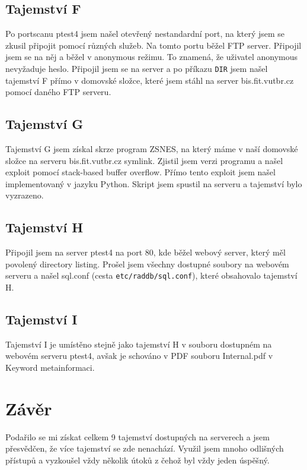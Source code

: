 \documentclass[11pt,a4paper]{article}
\begin{document}
\subsection{Tajemství F}

Po portscanu ptest4 jsem našel otevřený nestandardní port, na který jsem se zkusil připojit pomocí různých služeb. Na tomto portu běžel FTP server. Připojil jsem se na něj a běžel v anonymous režimu. To znamená, že uživatel anonymous nevyžaduje heslo. Připojil jsem se na server a po příkazu \texttt{DIR} jsem našel tajemství F přímo v domovské složce, které jsem stáhl na server bis.fit.vutbr.cz pomocí daného FTP serveru.

\subsection{Tajemství G}

Tajemství G jsem získal skrze program ZSNES, na který máme v naší domovské složce na serveru bis.fit.vutbr.cz symlink. Zjistil jsem verzi programu a našel exploit pomocí stack-based buffer overflow. Přímo tento exploit jsem našel implementovaný v jazyku Python. Skript jsem spustil na serveru a tajemství bylo vyzrazeno.

\subsection{Tajemství H}

Připojil jsem na server ptest4 na port 80, kde běžel webový server, který měl povolený directory listing. Prošel jsem všechny dostupné soubory na webovém serveru a našel sql.conf (cesta \texttt{etc/raddb/sql.conf}), které obsahovalo tajemství H.

\subsection{Tajemství I}

Tajemství I je umístěno stejně jako tajemství H v souboru dostupném na webovém serveru ptest4, avšak je schováno v PDF souboru Internal.pdf v Keyword metainformaci.


\section{Závěr}

Podařilo se mi získat celkem 9 tajemství dostupných na serverech a jsem přesvědčen, že více tajemství se zde nenachází. Využil jsem mnoho odlišných přístupů a vyzkoušel vždy několik útoků z čehož byl vždy jeden úspěšný.
\end{document}
